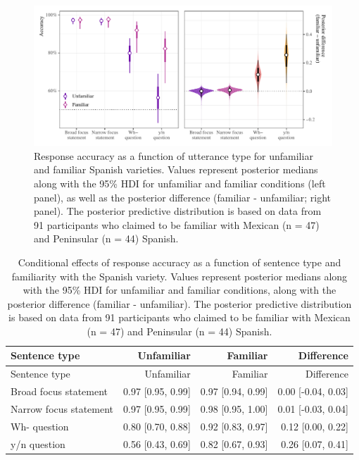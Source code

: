 \documentclass[]{article}
\begin{document}
\begin{figure}
\includegraphics[width=1\linewidth]{../../../../figs/manuscript/learner_variety_familiarity} \caption{Response accuracy as a function of utterance type for unfamiliar and familiar Spanish varieties. Values represent posterior medians along with the 95\% HDI for unfamiliar and familiar conditions (left panel), as well as the posterior difference (familiar - unfamiliar; right panel). The posterior predictive distribution is based on data from 91 participants who claimed to be familiar with Mexican (n = 47) and Peninsular (n = 44) Spanish.}\label{fig:plot-learner-variety-familiarity}
\end{figure}

\begin{longtable}[]{@{}lrrr@{}}
\caption{\label{tab:table-learner-variety-familiarity-conditional-effects}Conditional effects of response accuracy as a
function of sentence type and familiarity with the Spanish variety.
Values represent posterior medians along with the 95\% HDI for unfamiliar
and familiar conditions, along with the posterior difference
(familiar - unfamiliar). The posterior predictive distribution is based on
data from 91 participants
who claimed to be familiar with Mexican (n = 47)
and Peninsular (n = 44) Spanish.}\tabularnewline
\toprule()
Sentence type & Unfamiliar & Familiar & Difference \\
\midrule()
\endfirsthead
\toprule()
Sentence type & Unfamiliar & Familiar & Difference \\
\midrule()
\endhead
Broad focus statement & 0.97 {[}0.95, 0.99{]} & 0.97 {[}0.94, 0.99{]} & 0.00 {[}-0.04, 0.03{]} \\
Narrow focus statement & 0.97 {[}0.95, 0.99{]} & 0.98 {[}0.95, 1.00{]} & 0.01 {[}-0.03, 0.04{]} \\
Wh- question & 0.80 {[}0.70, 0.88{]} & 0.92 {[}0.83, 0.97{]} & 0.12 {[}0.00, 0.22{]} \\
y/n question & 0.56 {[}0.43, 0.69{]} & 0.82 {[}0.67, 0.93{]} & 0.26 {[}0.07, 0.41{]} \\
\bottomrule()
\end{longtable}
\end{document}
